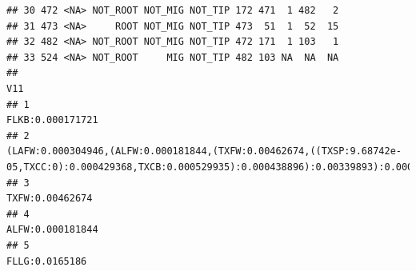 \documentclass[]{article}
\begin{document}
\begin{verbatim}
## 30 472 <NA> NOT_ROOT NOT_MIG NOT_TIP 172 471  1 482   2
## 31 473 <NA>     ROOT NOT_MIG NOT_TIP 473  51  1  52  15
## 32 482 <NA> NOT_ROOT NOT_MIG NOT_TIP 472 171  1 103   1
## 33 524 <NA> NOT_ROOT     MIG NOT_TIP 482 103 NA  NA  NA
##                                                                                                                                                                                                                                                                                                                                                                                                                  V11
## 1                                                                                                                                                                                                                                                                                                                                                                                                   FLKB:0.000171721
## 2                                                                                                                                                                                                                                                    (LAFW:0.000304946,(ALFW:0.000181844,(TXFW:0.00462674,((TXSP:9.68742e-05,TXCC:0):0.000429368,TXCB:0.000529935):0.000438896):0.00339893):0.000450879):0.000633288
## 3                                                                                                                                                                                                                                                                                                                                                                                                    TXFW:0.00462674
## 4                                                                                                                                                                                                                                                                                                                                                                                                   ALFW:0.000181844
## 5                                                                                                                                                                                                                                                                                                                                                                                                     FLLG:0.0165186

\end{verbatim}
\end{document}
